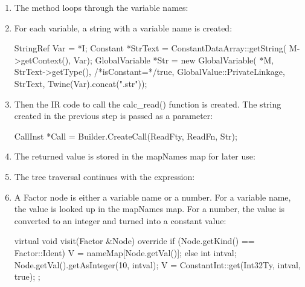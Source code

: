 \begin{enumerate}
\item
The method loops through the variable names:

\begin{cpp}
        for (auto I = Node.begin(), E = Node.end(); I != E;
            ++I) {
\end{cpp}

\item
For each variable, a string with a variable name is created:

\begin{cpp}
        StringRef Var = *I;
        Constant *StrText = ConstantDataArray::getString(
            M->getContext(), Var);
        GlobalVariable *Str = new GlobalVariable(
            *M, StrText->getType(),
            /*isConstant=*/true,
            GlobalValue::PrivateLinkage,
            StrText, Twine(Var).concat(".str"));
\end{cpp}

\item
Then the IR code to call the calc\_read() function is created. The string created in the previous step is passed as a parameter:

\begin{cpp}
        CallInst *Call =
            Builder.CreateCall(ReadFty, ReadFn, {Str});
\end{cpp}

\item
The returned value is stored in the mapNames map for later use:

\begin{cpp}
        nameMap[Var] = Call;
    }
\end{cpp}

\item
The tree traversal continues with the expression:

\begin{cpp}
    Node.getExpr()->accept(*this);
};
\end{cpp}

\item
A Factor node is either a variable name or a number. For a variable name, the value is looked up in the mapNames map. For a number, the value is converted to an integer and turned into a constant value:

\begin{cpp}
virtual void visit(Factor &Node) override {
    if (Node.getKind() == Factor::Ident) {
        V = nameMap[Node.getVal()];
    } else {
        int intval;
        Node.getVal().getAsInteger(10, intval);
        V = ConstantInt::get(Int32Ty, intval, true);
    }
};
\end{cpp}


\end{enumerate}
